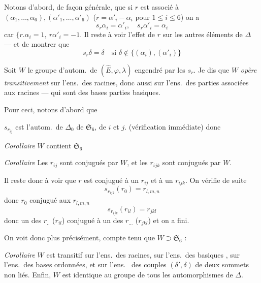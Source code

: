 \documentclass[11pt,a4paper]{article}
\begin{document}
\struck{\ill{}} Notons d'abord, de façon générale, que si $r$ est associé à
$(\alpha_1, \dots, \alpha_6), (\alpha'_1, \dots, \alpha'_6)$ ($r = \alpha'_i
- \alpha_i$ pour $1 \leq i \leq 6$) on a
\[
\boxed{s_r \alpha_i = \alpha'_i, \quad s_r \alpha'_i = \alpha_i}
\]
car $\lbrace r.\alpha_i = 1, \ r\alpha'_i = -1$. Il reste à voir l'effet de
$r$ sur les autres éléments de $\Delta$ — et de montrer que
\[
\boxed{s_r \delta = \delta \quad \text{si } \delta \notin \{(\alpha_i), (\alpha'_i)\}}
\]



Soit $W$ le groupe d'autom.\ de $(\widehat{E}, \varphi, \lambda)$
 engendré par les
$s_r$. Je dis que $W$ \emph{opère transitivement} sur l'ens.\ des racines,
donc aussi sur l'ens.\ des parties 
\ill{} associées aux racines — qui sont des bases \ill{} parties basiques.

Pour ceci, notons d'abord que 

$s_{r_{ij}}$ est l'autom.\ de $\Delta_0$ 
 de $\mathfrak{S}_6$,  
 de $i$ et $j$.
(vérification immédiate) donc

\emph{Corollaire} $W$ contient $\mathfrak{S}_6$

\emph{Corollaire} Les $r_{ij}$ sont conjugués par $W$, et les $r_{ijk}$ sont
conjugués par $W$.

Il reste donc à voir que $r$ est conjugué à un $r_{ij}$ et à un $r_{ijk}$.
 On vérifie \struck{\ill{}} de suite
\[
s_{r_{ijk}}(r_0) = r_{l,m,n}
\]
donc $r_0$ conjugué aux $r_{l,m,n}$
\[
s_{r_{ijk}}(r_{il}) = r_{jkl}
\]
donc \struck{\ill{}} un des $r_{..}$ ($r_{il}$) conjugué à un des $r_{...}$
($r_{jkl}$) et on a fini.

On voit donc plus précisément, compte tenu que $W \supset \mathfrak{S}_6$ :

\emph{Corollaire} $W$ est transitif sur l'ens.\ des  racines,
sur l'ens.\ des   basiques , sur l'ens.\ des bases ordonnées, et
sur l'ens.\  des couples $(\delta', \delta)$ de deux sommets non
liés. Enfin, $W$ est identique au groupe de tous les automorphismes de
$\Delta$.
\end{document}
